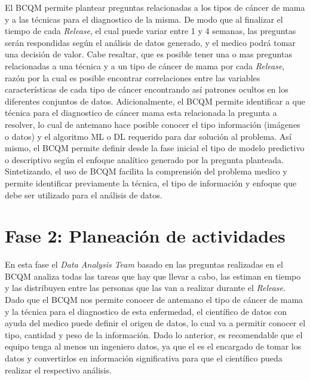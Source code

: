 El BCQM permite plantear preguntas relacionadas a los tipos de cáncer de mama y a las técnicas para el diagnostico de la misma. De modo que al finalizar el tiempo de cada \textit{Release}, el cual puede variar entre 1 y 4 semanas, las preguntas serán respondidas según el análisis de datos generado, y el medico podrá tomar una decisión de valor. Cabe resaltar, que es posible tener una o mas preguntas relacionadas a una técnica y a un tipo de cáncer de mama por cada \textit{Release}, razón por la cual es posible encontrar correlaciones entre las variables características de cada tipo de cáncer encontrando así patrones ocultos en los diferentes conjuntos de datos. Adicionalmente, el BCQM permite identificar a que técnica para el diagnostico de cáncer mama esta relacionada la pregunta a resolver, lo cual de antemano hace posible conocer el tipo información (imágenes o datos) y el algoritmo  ML o DL requerido para dar solución al problema. Así mismo, el BCQM permite definir desde la fase inicial el tipo de modelo predictivo o descriptivo según el enfoque analítico generado por la pregunta planteada. Sintetizando, el uso de BCQM facilita la comprensión del problema medico y permite identificar previamente la técnica, el tipo de información y enfoque que debe ser utilizado para el análisis de datos.  

\section{Fase 2: Planeación de actividades}
En esta fase el \textit{Data Analysis Team} basado en las preguntas realizadas en el BCQM analiza todas las tareas que hay que llevar a cabo, las estiman en tiempo y las distribuyen entre las personas que las van a realizar durante el \textit{Release}. Dado que el BCQM nos permite conocer de antemano el tipo de cáncer de mama y la técnica para el diagnostico de esta enfermedad, el científico de datos con ayuda del medico puede definir el origen de datos, lo cual va a permitir conocer el tipo, cantidad y peso de la información. Dado lo anterior, es recomendable que el equipo tenga al menos un ingeniero datos, ya que el es el encargado de tomar los datos y convertirlos en información significativa para que el científico pueda realizar el respectivo análisis.   

